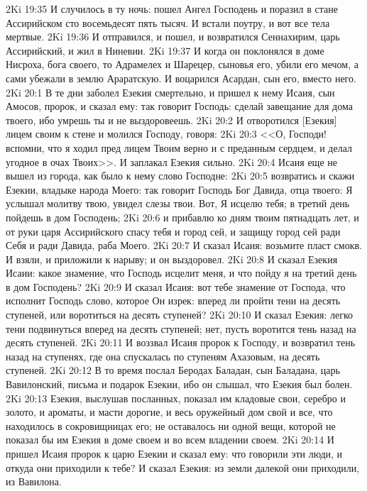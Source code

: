 \rsbpar\vs 2Ki 19:35 И случилось в ту ночь: пошел Ангел Господень и поразил в стане Ассирийском сто восемьдесят пять тысяч. И встали поутру, и вот все тела мертвые.
\vs 2Ki 19:36 И отправился, и пошел, и возвратился Сеннахирим, царь Ассирийский, и жил в Ниневии.
\vs 2Ki 19:37 И когда он поклонялся в доме Нисроха, бога своего, то Адрамелех и Шарецер, сыновья его, убили его мечом, а сами убежали в землю Араратскую. И воцарился Асардан, сын его, вместо него.
\vs 2Ki 20:1 В те дни заболел Езекия смертельно, и пришел к нему Исаия, сын Амосов, пророк, и сказал ему: так говорит Господь: сделай завещание для дома твоего, ибо умрешь ты и не выздоровеешь.
\vs 2Ki 20:2 И отворотился [Езекия] лицем своим к стене и молился Господу, говоря:
\vs 2Ki 20:3 <<О, Господи! вспомни, что я ходил пред лицем Твоим верно и с преданным  сердцем, и делал угодное в очах Твоих>>. И заплакал Езекия сильно.
\vs 2Ki 20:4 Исаия еще не вышел из города, как было к нему слово Господне:
\vs 2Ki 20:5 возвратись и скажи Езекии, владыке народа Моего: так говорит Господь Бог Давида, отца твоего: Я услышал молитву твою, увидел слезы твои. Вот, Я исцелю тебя; в третий день пойдешь в дом Господень;
\vs 2Ki 20:6 и прибавлю ко дням твоим пятнадцать лет, и от руки царя Ассирийского спасу тебя и город сей, и защищу город сей ради Себя и ради Давида, раба Моего.
\vs 2Ki 20:7 И сказал Исаия: возьмите пласт смокв. И взяли, и приложили к нарыву; и он выздоровел.
\vs 2Ki 20:8 И сказал Езекия Исаии: какое знамение, что Господь исцелит меня, и что пойду я на третий день в дом Господень?
\vs 2Ki 20:9 И сказал Исаия: вот тебе знамение от Господа, что исполнит Господь слово, которое Он изрек: вперед ли пройти тени на десять ступеней, или воротиться на десять ступеней?
\vs 2Ki 20:10 И сказал Езекия: легко тени подвинуться вперед на десять ступеней; нет, пусть воротится тень назад на десять ступеней.
\vs 2Ki 20:11 И воззвал Исаия пророк к Господу, и возвратил тень назад на ступенях, где она спускалась по ступеням Ахазовым, на десять ступеней.
\rsbpar\vs 2Ki 20:12 В то время послал Беродах Баладан, сын Баладана, царь Вавилонский, письма и подарок Езекии, ибо он слышал, что Езекия был болен.
\vs 2Ki 20:13 Езекия, выслушав посланных, показал им кладовые свои, серебро и золото, и ароматы, и масти дорогие, и весь оружейный дом свой и все, что находилось в сокровищницах его; не оставалось ни одной вещи, которой не показал бы им Езекия в доме своем и во всем владении своем.
\rsbpar\vs 2Ki 20:14 И пришел Исаия пророк к царю Езекии и сказал ему: что говорили эти люди, и откуда они приходили к тебе? И сказал Езекия: из земли далекой они приходили, из Вавилона.
